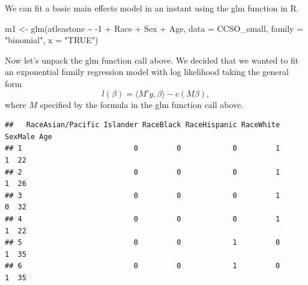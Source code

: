 \documentclass[
  ignorenonframetext,
]{beamer}
\newenvironment{Shaded}{\begin{snugshade}}{\end{snugshade}}
\newcommand{\AttributeTok}[1]{\textcolor[rgb]{0.77,0.63,0.00}{#1}}
\newcommand{\DecValTok}[1]{\textcolor[rgb]{0.00,0.00,0.81}{#1}}
\newcommand{\FunctionTok}[1]{\textcolor[rgb]{0.00,0.00,0.00}{#1}}
\newcommand{\NormalTok}[1]{#1}
\newcommand{\OtherTok}[1]{\textcolor[rgb]{0.56,0.35,0.01}{#1}}
\newcommand{\SpecialCharTok}[1]{\textcolor[rgb]{0.00,0.00,0.00}{#1}}
\newcommand{\StringTok}[1]{\textcolor[rgb]{0.31,0.60,0.02}{#1}}
\begin{document}
\begin{frame}[fragile]{}
\protect\hypertarget{section-5}{}
We can fit a basic main effects model in an instant using the glm
function in R.

\vspace{12pt}
\tiny

\begin{Shaded}
\begin{Highlighting}[]
\NormalTok{m1 }\OtherTok{\textless{}{-}} \FunctionTok{glm}\NormalTok{(atleastone }\SpecialCharTok{\textasciitilde{}} \SpecialCharTok{{-}}\DecValTok{1} \SpecialCharTok{+}\NormalTok{ Race }\SpecialCharTok{+}\NormalTok{ Sex }\SpecialCharTok{+}\NormalTok{ Age, }\AttributeTok{data =}\NormalTok{ CCSO\_small, }
          \AttributeTok{family =} \StringTok{"binomial"}\NormalTok{, }\AttributeTok{x =} \StringTok{"TRUE"}\NormalTok{)}
\end{Highlighting}
\end{Shaded}

\vspace{12pt}
\normalsize

Now let's unpack the glm function call above. We decided that we wanted
to fit an exponential family regression model with log likelihood taking
the general form \[
  l(\beta) = \langle M'y, \beta \rangle - c(M\beta),
\] where \(M\) specified by the formula in the glm function call above.

\tiny

\begin{Shaded}
\end{Shaded}

\begin{verbatim}
##   RaceAsian/Pacific Islander RaceBlack RaceHispanic RaceWhite SexMale Age
## 1                          0         0            0         1       1  22
## 2                          0         0            0         1       1  26
## 3                          0         0            0         1       0  32
## 4                          0         0            0         1       1  22
## 5                          0         0            1         0       1  35
## 6                          0         0            1         0       1  35
\end{verbatim}
\end{frame}
\end{document}
